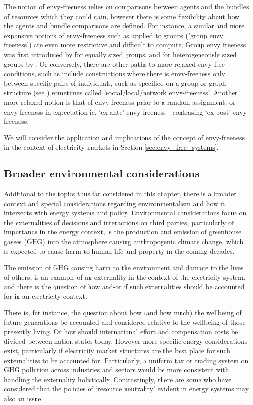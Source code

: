 The notion of envy-freeness relies on comparisons between agents and the bundles of resources which they could gain, however there is some flexibility about how the agents and bundle comparisons are defined.
For instance, a similar and more expansive notions of envy-freeness such as applied to groups ('group envy freeness') are even more restrictive and difficult to compute; Group envy freeness was first introduced by \cite{BERLIANT1992201} for equally sized groups, and for heterogeneously sized groups by \cite{DBLP:conf/aaai/ConitzerF0V19}.
Or conversely, there are other paths to more relaxed envy-free conditions, such as include constructions where there is envy-freeness only between specific pairs of individuals, such as specified on a group or graph structure (see \cite{FLAMMINI20191}) sometimes called 'social/local/network envy-freeness'.
Another more relaxed notion is that of envy-freeness prior to a random assignment, or envy-freeness in expectation ie. `ex-ante' envy-freeness - contrasing `ex-post' envy-freeness.

We will consider the application and implications of the concept of envy-freeness in the context of electricity markets in Section \ref{sec:envy_free_systems}.



\subsection{Broader environmental considerations}\label{sec:philosophy_environmentalism}
Additional to the topics thus far considered in this chapter, there is a broader context and special considerations regarding environmentalism and how it intersects with energy systems and policy.
Environmental considerations focus on the externalities of decisions and interactions on third parties, particularly of importance in the energy context, is the production and emission of greenhouse gasses (GHG) into the atmosphere causing anthropogenic climate change, which is expected to cause harm to human life and property in the coming decades.\citep{ipcc_report_2022}

The emission of GHG causing harm to the environment and damage to the lives of others, is an example of an externality in the context of the electricity system, and there is the question of how and-or if such externalities should be accounted for in an electricity context.

There is, for instance, the question about how (and how much) the wellbeing of future generations be accounted and considered relative to the wellbeing of those presently living. \citep{sep-justice-intergenerational} Or how should international effort and compensation costs be divided between nation states today. \citep{10.1086/382247} 
However more specific energy considerations exist, particularly if electricity market structures are the best place for such externalities to be accounted for.
Particularly, a uniform tax or trading system on GHG pollution across industries and sectors would be more consistent with handling the externality holistically.
Contrastingly, there are some who have considered that the policies of `resource neutrality' evident in energy systems may also an issue. \citep{climate_change1}

